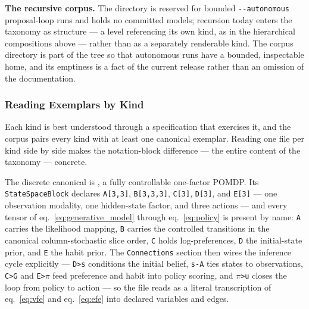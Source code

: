 \documentclass[
  english,
  9pt,
]{extarticle}
\begin{document}
\textbf{The recursive corpus.} The 
directory is reserved for bounded \texttt{-\/-autonomous} proposal-loop
runs and holds no committed models; recursion today enters the taxonomy
as structure --- a level referencing its own kind, as in the
hierarchical compositions above --- rather than as a separately
renderable kind. The corpus directory is part of the tree so that
autonomous runs have a bounded, inspectable home, and its emptiness is a
fact of the current release rather than an omission of the
documentation.

\subsubsection{Reading Exemplars by
Kind}\label{reading-exemplars-by-kind}

Each kind is best understood through a specification that exercises it,
and the corpus pairs every kind with at least one canonical exemplar.
Reading one file per kind side by side makes the notation-block
difference --- the entire content of the taxonomy --- concrete.

The discrete canonical is
, a fully
controllable one-factor POMDP. Its \texttt{StateSpaceBlock} declares
\texttt{A{[}3,3{]}}, \texttt{B{[}3,3,3{]}}, \texttt{C{[}3{]}},
\texttt{D{[}3{]}}, and \texttt{E{[}3{]}} --- one observation modality,
one hidden-state factor, and three actions --- and every tensor of
eq.~\ref{eq:generative_model} through eq.~\ref{eq:policy} is present by
name: \texttt{A} carries the likelihood mapping, \texttt{B} carries the
controlled transitions in the canonical column-stochastic slice order,
\texttt{C} holds log-preferences, \texttt{D} the initial-state prior,
and \texttt{E} the habit prior. The \texttt{Connections} section then
wires the inference cycle explicitly --- \texttt{D\textgreater{}s}
conditions the initial belief, \texttt{s-A} ties states to observations,
\texttt{C\textgreater{}G} and \texttt{E\textgreater{}\texorpdfstring{\ensuremath{\pi}}{pi}} feed preference
and habit into policy scoring, and \texttt{\texorpdfstring{\ensuremath{\pi}}{pi}\textgreater{}u} closes the
loop from policy to action --- so the file reads as a literal
transcription of eq.~\ref{eq:vfe} and eq.~\ref{eq:efe} into declared
variables and edges.
\end{document}
